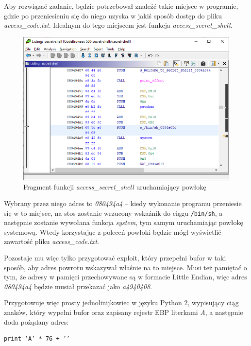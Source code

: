 \documentclass[language=polish,type=eng]{aghmodern}
\begin{document}
\begin{appendices}
Aby rozwiązać zadanie, będzie potrzebował znaleźć takie miejsce w programie, gdzie
po przeniesieniu się do niego uzyska w jakiś sposób dostęp do pliku \emph{access\_code.txt}.
Idealnym do tego miejscem jest funkcja \emph{access\_secret\_shell}.

\begin{figure}[H]
\centering
\includegraphics[width=\textwidth]{500_bin_sh_address}
\caption{Fragment funkcji \emph{access\_secret\_shell} uruchamiający powłokę}
\end{figure}

Wybrany przez niego adres to \emph{080494a4} -- kiedy wykonanie programu przeniesie się w to miejsce,
na stos zostanie wrzucony wskaźnik do ciągu \texttt{/bin/sh}, a następnie zostanie wywołana
funkcja \emph{system}, tym samym uruchamiając powłokę systemową. Wtedy korzystając z poleceń
powłoki będzie mógł wyświetlić zawartość pliku \emph{access\_code.txt}.

Pozostaje mu więc tylko przygotować exploit, który przepełni bufor
w taki sposób, aby adres powrotu wskazywał właśnie na to miejsce. Musi też pamiętać
o tym, że adresy w pamięci przechowywane są w formacie Little Endian, więc adres
\emph{080494a4} będzie musiał przekazać jako \emph{a4940408}.

Przygotowuje więc prosty jednolinijkowiec w języku Python 2, wypisujący ciąg znaków,
który wypełni bufor oraz zapisany rejestr EBP literkami \emph{A},
a następnie doda pożądany adres:

\texttt{print 'A' * 76 + ''}


\end{appendices}
\end{document}
